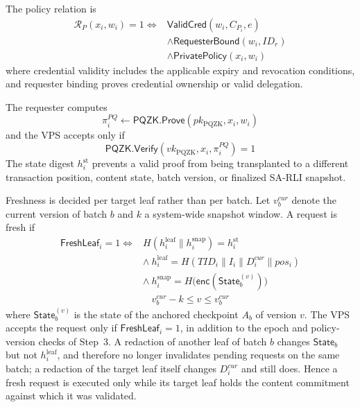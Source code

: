 \documentclass[lettersize,journal]{IEEEtran}
\begin{document}
The policy relation is
\begin{equation}
\begin{aligned}
\mathcal{R}_{P}(x_i,w_i)=1
\iff{}&
\mathsf{ValidCred}(w_i,C_{P_i},e)\\
&\land
\mathsf{RequesterBound}(w_i,ID_r)\\
&\land
\mathsf{PrivatePolicy}(x_i,w_i)
\end{aligned}
\end{equation}
where credential validity includes the applicable expiry and revocation
conditions, and requester binding proves credential ownership or valid
delegation.

The requester computes
\begin{equation}
\pi_i^{PQ}\leftarrow
\mathsf{PQZK.Prove}
(pk_{\mathrm{PQZK}},x_i,w_i)
\end{equation}
and the VPS accepts only if
\begin{equation}
\mathsf{PQZK.Verify}
(vk_{\mathrm{PQZK}},x_i,\pi_i^{PQ})=1
\label{eq:pqzk_verify}
\end{equation}
The state digest $h_i^{\mathrm{st}}$ prevents a valid proof from being
transplanted to a different transaction position, content state, batch
version, or finalized SA-RLI snapshot.

Freshness is decided per target leaf rather than per
batch. Let $v_b^{cur}$ denote the current version of batch $b$ and $k$ a
system-wide snapshot window. A request is fresh if
\begin{equation}
\begin{aligned}
\mathsf{FreshLeaf}_i=1
\iff{}&
H(h_i^{\mathrm{leaf}}\parallel h_i^{\mathrm{snap}})=h_i^{\mathrm{st}}\\
&\land\
h_i^{\mathrm{leaf}}=H(TID_i\parallel I_i\parallel D_i^{cur}\parallel pos_i)\\
&\land\
h_i^{\mathrm{snap}}=H\big(\mathsf{enc}(\mathsf{State}_b^{(v)})\big)\\
&\phantom{\land\ }
v_b^{cur}-k\le v\le v_b^{cur}
\end{aligned}
\label{eq:freshleaf}
\end{equation}
where $\mathsf{State}_b^{(v)}$ is the state of the
anchored checkpoint $A_b$ of version $v$. The VPS accepts the request only
if $\mathsf{FreshLeaf}_i=1$, in addition to the epoch and policy-version
checks of Step~3. A redaction of another leaf of batch $b$ changes
$\mathsf{State}_b$ but not $h_i^{\mathrm{leaf}}$, and therefore no longer
invalidates pending requests on the same batch; a redaction of the target
leaf itself changes $D_i^{cur}$ and still does. Hence a fresh request is
executed only while its target leaf holds the content commitment against
which it was validated.
\end{document}
